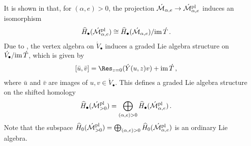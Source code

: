 \documentclass[11pt]{amsart}
\theoremstyle{remark}
\newcommand{\Mdash}{\acute{\mathcal{M}}}
\newcommand{\im}{\textnormal{im}\,}
\newcommand{\wh}[1]{\widehat{#1}}
\newcommand{\pl}[0]{\textnormal{pl}}
\numberwithin{theorem}{section}
\begin{document}
    It is shown in \cite[Theorem 4.8]{Joy21} that, 
    for $(\alpha,e) > 0$,
    the projection $\Mdash_{\alpha,e} \to \Mdash^\pl_{\alpha,e}$ induces an isomorphism 
    $$ \wh{H}_\bullet(\Mdash^\pl_{\alpha,e}) \cong \wh{H}_\bullet(\Mdash_{\alpha,e})/\im \acute{T}\,.$$
    Due to \cite{Bor86}, the vertex algebra on $\acute{V}_\bullet$ induces a graded Lie algebra structure on $\acute{V}_\bullet/ \im \acute{T}$, which is given by
    \begin{equation}\label{equation definition of bracket}
    [\bar{u},\bar{v}] = \Res_{z=0}(\acute Y(u,z)v) + \im \acute{T} \,,
    \end{equation}
    where $\bar u$ and $\bar v$ are images of $u, v \in \acute{V}_\bullet$.
    This defines a graded Lie algebra structure on the shifted homology
    $$ \wh{H}_\bullet(\Mdash^\pl_{>0}) =  \bigoplus_{(\alpha,e) >0} \wh{H}_\bullet(\Mdash^\pl_{\alpha,e})\,.$$
    Note that the subspace $\wh{H}_0(\Mdash^\pl_{>0}) = \bigoplus_{(\alpha,e)>0} \wh{H}_0(\Mdash^\pl_{\alpha,e})$ 
    is an ordinary Lie algebra.
\end{document}

